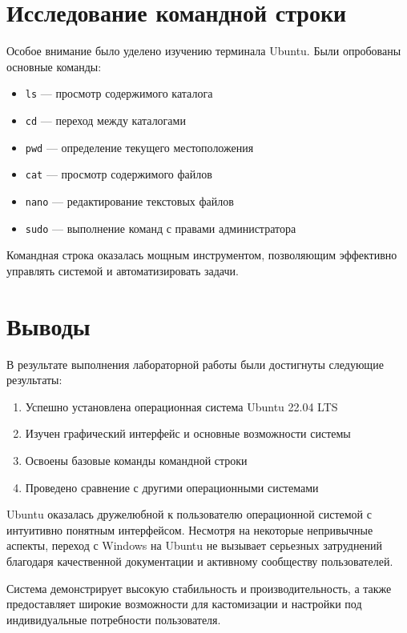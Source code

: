 \section{Исследование командной строки}

Особое внимание было уделено изучению терминала Ubuntu. Были опробованы основные команды:

\begin{itemize}
    \item \texttt{ls} --- просмотр содержимого каталога
    \item \texttt{cd} --- переход между каталогами
    \item \texttt{pwd} --- определение текущего местоположения
    \item \texttt{cat} --- просмотр содержимого файлов
    \item \texttt{nano} --- редактирование текстовых файлов
    \item \texttt{sudo} --- выполнение команд с правами администратора
\end{itemize}

Командная строка оказалась мощным инструментом, позволяющим эффективно управлять системой и автоматизировать задачи.

\section{Выводы}

В результате выполнения лабораторной работы были достигнуты следующие результаты:

\begin{enumerate}
    \item Успешно установлена операционная система Ubuntu 22.04 LTS
    \item Изучен графический интерфейс и основные возможности системы
    \item Освоены базовые команды командной строки
    \item Проведено сравнение с другими операционными системами
\end{enumerate}

Ubuntu оказалась дружелюбной к пользователю операционной системой с интуитивно понятным интерфейсом. Несмотря на некоторые непривычные аспекты, переход с Windows на Ubuntu не вызывает серьезных затруднений благодаря качественной документации и активному сообществу пользователей.

Система демонстрирует высокую стабильность и производительность, а также предоставляет широкие возможности для кастомизации и настройки под индивидуальные потребности пользователя.
